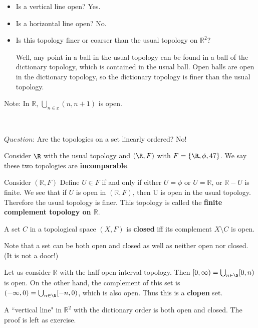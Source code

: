 \begin{itemize}
\item Is a vertical line open?  Yes.
\item Is a horizontal line open?  No.
\item Is this topology finer or coarser than the usual topology on $\mathbb{R}^{2}$?

Well, any point in a ball in the usual topology can be found in a ball of the dictionary topology, which is contained in the usual ball.  Open balls are open in the dictionary topology, so the dictionary topology is finer than the usual topology.
\end{itemize}

Note: In $\mathbb{R}$, $\bigcup_{n\in \mathbb{z}}(n,n+1)$ is open.

\mbox{ }

$Question$: Are the topologies on a set linearly ordered?  No!
\begin{example}
Consider $\R$ with the usual topology and $(\R, F)$ with $F = \left\{ \R, \phi,47 \right\}$.  We say these two topologies are {\bf incomparable}. 
\end{example}
\begin{example}
Consider $(\mathbb{R},F)$ Define $U \in F$ if and only if either $U=\phi$ or $U=\mathbb{R}$, or $\mathbb{R}-U$ is finite. We see that if $U$ is open in $(\mathbb{R},F)$, then U is open in the usual topology. Therefore the usual topology is finer.  This topology is called the {\bf finite complement topology on $\mathbb{R}$}.
\end{example}

\begin{definition}
 A set $C$ in a topological space $(X,F)$ is {\bf closed} iff its complement $X\setminus C$ is open.
 \end{definition}
 
Note that a set can be both open and closed as well as neither open nor closed. (It is not a door!)

\begin{example}
Let us consider $\mathbb{R}$ with the half-open interval topology. Then $[ 0,\infty) =\bigcup _{n \in \N} [0,n)$ is open. On the other hand, the complement of this set is $(-\infty,0) =\bigcup_{n \in\N } [-n,0)$, which is also open. Thus this is a {\bf clopen} set.
\end{example}

\begin{example}
A ``vertical line" in $\mathbb{R}^{2}$ with the dictionary order is both open and closed. The proof is left as exercise.
\end{example}


